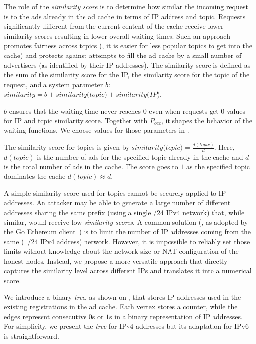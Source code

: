 The role of the \emph{similarity score} is to determine how similar the incoming request is to the ads already in the ad cache in terms of IP address and topic. 
Requests significantly different from the current content of the cache receive lower similarity scores resulting in lower overall waiting times. 
Such an approach promotes fairness across topics (\ie, it is easier for less popular topics to get into the cache) and protects against attempts to fill the ad cache by a small number of advertisers (as identified by their IP addresses). The similarity score is defined as the sum of the similarity score for the IP, the similarity score for the topic of the request, and a system parameter $b$: $\textit{similarity} = b + \textit{similarity(topic)} + \textit{similarity(IP)}$. 

$b$ ensures that the waiting time never reaches $0$ even when requests get $0$ values for IP and topic similarity score. Together with $P_\textit{occ}$, it shapes the behavior of the waiting functions. We choose values for those parameters in .

The similarity score for topics is given by $\textit{similarity(topic)}= \frac{d(\textit{topic})}{d}$.
Here, $d(\textit{topic})$ is the number of ads for the specified topic already in the cache and $d$ is the total number of ads in the cache. 
The score goes to $1$ as the specified topic dominates the cache $d(\textit{topic}) \approx d$. 

A simple similarity score used for topics cannot be securely applied to IP addresses. 
An attacker may be able to generate a large number of different addresses sharing the same prefix (\eg using a single /24 IPv4 network) that, while similar, would receive low \emph{similarity scores}.
A common solution (\eg, as adopted by the Go Ethereum client~\cite{geth,marcus2018low}) is to limit the number of IP addresses coming from the same (\eg \ /24 IPv4 address) network.
However, it is impossible to reliably set those limits without knowledge about the network size or NAT configuration of the honest nodes. 
Instead, we propose a more versatile approach that directly captures the similarity level across different IPs and translates it into a numerical score. 

We introduce a binary \emph{tree}, as shown on , that stores IP addresses used in the existing registrations in the ad cache.
Each vertex stores a counter, while the edges represent consecutive $0$s or $1$s in a binary representation of IP addresses.
For simplicity, we present the \emph{tree} for IPv4 addresses but its adaptation for IPv6 is straightforward.

